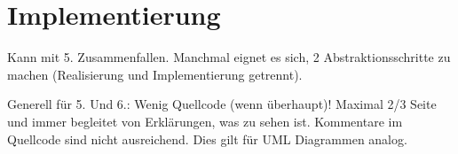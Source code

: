 \chapter{Implementierung}

Kann mit 5. Zusammenfallen. Manchmal eignet es sich, 2 Abstraktionsschritte zu machen (Realisierung und Implementierung getrennt).  
  
Generell für 5. Und 6.: Wenig Quellcode (wenn überhaupt)! Maximal 2/3 Seite und immer begleitet von Erklärungen, was zu sehen ist. Kommentare im Quellcode sind nicht ausreichend. Dies gilt für UML Diagrammen analog.  

\cite{repo}
